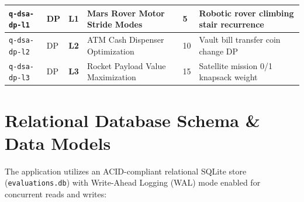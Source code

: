 \documentclass[12pt, a4paper]{report}
\begin{document}
\begin{center}
\begin{longtable}{|L{2.2cm}|L{2.0cm}|C{0.9cm}|L{3.8cm}|C{0.9cm}|L{6.2cm}|}
\texttt{q-dsa-dp-l1} & DP & \textbf{L1} & Mars Rover Motor Stride Modes & 5 & Robotic rover climbing stair recurrence \\
\hline
{}
\texttt{q-dsa-dp-l2} & DP & \textbf{L2} & ATM Cash Dispenser Optimization & 10 & Vault bill transfer coin change DP \\
\hline
\texttt{q-dsa-dp-l3} & DP & \textbf{L3} & Rocket Payload Value Maximization & 15 & Satellite mission 0/1 knapsack weight \\
\hline
\end{longtable}
\end{center}

\chapter{Relational Database Schema \& Data Models}

The application utilizes an ACID-compliant relational SQLite store (\texttt{evaluations.db}) with Write-Ahead Logging (WAL) mode enabled for concurrent reads and writes:
\end{document}
